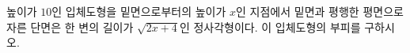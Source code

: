 \hspace*{2mm}\begin{minipage}[t]{\dimexpr\linewidth-2mm\relax}\vspace{0pt}
높이가 $10$인 입체도형을 밑면으로부터의 높이가 $x$인 지점에서 밑면과 평행한 평면으로 자른 단면은 한 변의 길이가 $\sqrt{2x+4}$인 정사각형이다. 이 입체도형의 부피를 구하시오.\end{minipage}
